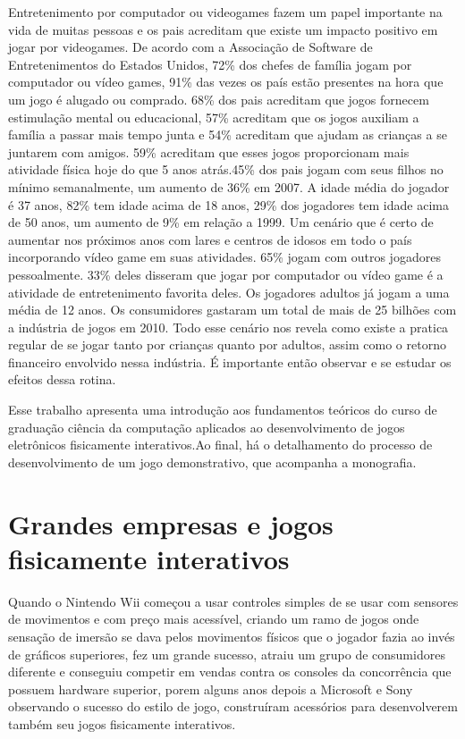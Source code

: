  Entretenimento por computador ou videogames fazem um papel importante na vida de muitas pessoas e os pais acreditam que existe um impacto positivo em jogar por videogames.
De acordo com a Associação de Software de Entretenimentos do Estados Unidos\cite{ESA}, 72\% dos chefes de família jogam por computador ou vídeo games,
91\% das vezes os país estão presentes na hora que um jogo é alugado ou comprado. 68\% dos pais acreditam que jogos fornecem estimulação mental ou educacional,
57\% acreditam que os jogos auxiliam a família a passar mais tempo junta e 54\% acreditam que ajudam as crianças a se juntarem com amigos. 59\% acreditam que esses
jogos proporcionam mais atividade física hoje do que 5 anos atrás.45\% dos pais jogam com seus filhos no mínimo semanalmente, um aumento de 36\% em 2007.
A idade média do jogador é 37 anos, 82\% tem idade acima de 18 anos, 29\% dos jogadores tem idade acima de 50 anos, um aumento de 9\% em relação a 1999.
Um cenário que é certo de aumentar nos próximos anos com lares e centros de idosos em todo o país incorporando vídeo game em suas atividades.
65\% jogam com outros jogadores pessoalmente. 33\% deles disseram que jogar por computador ou vídeo game é a atividade de entretenimento favorita deles.
Os jogadores adultos já jogam a uma média de 12 anos. Os consumidores gastaram um total de mais de 25 bilhões com a indústria de jogos em 2010.
Todo esse cenário nos revela como existe a pratica regular de se jogar tanto por crianças quanto por adultos, assim como o retorno financeiro envolvido nessa
indústria. É importante então observar e se estudar os efeitos dessa rotina.

 Esse trabalho apresenta uma introdução aos fundamentos teóricos do curso de graduação ciência da computação aplicados ao desenvolvimento de jogos eletrônicos
fisicamente interativos.Ao final, há o detalhamento do processo de desenvolvimento de um jogo demonstrativo, que acompanha a monografia.

\section{Grandes empresas e jogos fisicamente interativos}

 Quando o Nintendo Wii começou a usar controles simples de se usar com sensores de movimentos e com preço mais acessível, criando um ramo de jogos onde sensação
de imersão se dava pelos movimentos físicos que o jogador fazia ao invés de gráficos superiores, fez um grande sucesso, atraiu um grupo de consumidores diferente
e conseguiu competir em vendas contra os consoles  da concorrência que possuem hardware superior, porem alguns anos depois a Microsoft e Sony observando o sucesso
do estilo de jogo, construíram acessórios para desenvolverem também seu jogos fisicamente interativos.

